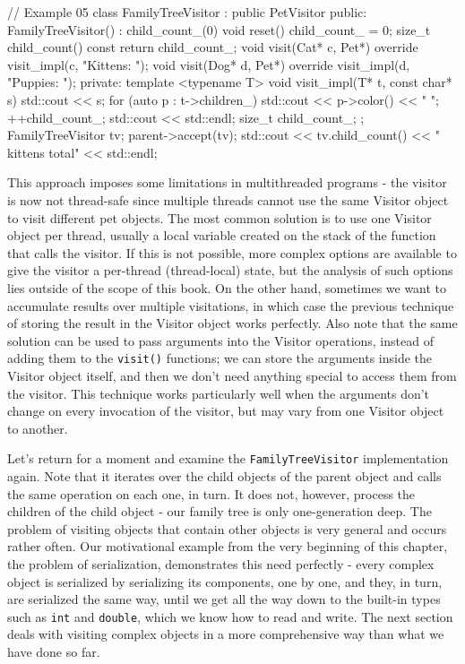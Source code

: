 \begin{code}
// Example 05
class FamilyTreeVisitor : public PetVisitor {
  public:
  FamilyTreeVisitor() : child_count_(0) {}
  void reset() { child_count_ = 0; }
  size_t child_count() const { return child_count_; }
  void visit(Cat* c, Pet*) override {
    visit_impl(c, "Kittens: ");
  }
  void visit(Dog* d, Pet*) override {
    visit_impl(d, "Puppies: ");
  }
  private:
  template <typename T>
  void visit_impl(T* t, const char* s) {
    std::cout << s;
    for (auto p : t->children_) {
      std::cout << p->color() << " ";
        ++child_count_;
      }
      std::cout << std::endl;
  }
  size_t child_count_;
};
FamilyTreeVisitor tv;
parent->accept(tv);
std::cout << tv.child_count() << " kittens total"
          << std::endl;
\end{code}

This approach imposes some limitations in multithreaded programs - the visitor is now not thread-safe since multiple threads cannot use the same Visitor object to visit different pet objects. The most common solution is to use one Visitor object per thread, usually a local variable created on the stack of the function that calls the visitor. If this is not possible, more complex options are available to give the visitor a per-thread (thread-local) state, but the analysis of such options lies outside of the scope of this book. On the other hand, sometimes we want to accumulate results over multiple visitations, in which case the previous technique of storing the result in the Visitor object works perfectly. Also note that the same solution can be used to pass arguments into the Visitor operations, instead of adding them to the \texttt{visit()} functions; we can store the arguments inside the Visitor object itself, and then we don't need anything special to access them from the visitor. This technique works particularly well when the arguments don't change on every invocation of the visitor, but may vary from one Visitor object to another.

Let's return for a moment and examine the \texttt{FamilyTreeVisitor} implementation again. Note that it iterates over the child objects of the parent object and calls the same operation on each one, in turn. It does not, however, process the children of the child object - our family tree is only one-generation deep. The problem of visiting objects that contain other objects is very general and occurs rather often. Our motivational example from the very beginning of this chapter, the problem of serialization, demonstrates this need perfectly - every complex object is serialized by serializing its components, one by one, and they, in turn, are serialized the same way, until we get all the way down to the built-in types such as \texttt{int} and \texttt{double}, which we know how to read and write. The next section deals with visiting complex objects in a more comprehensive way than what we have done so far.

